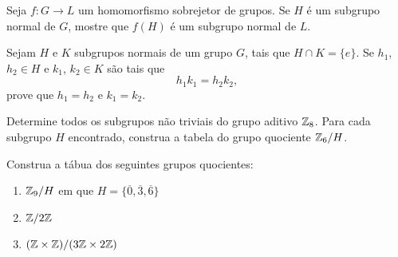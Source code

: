 \documentclass[12pt]{exam}
\begin{document}
    \questao{} Seja $f : G \to L$ um homomorfismo sobrejetor de grupos. Se $H$ é um subgrupo normal de $G$, mostre que $f(H)$ é um subgrupo normal de $L$.
  
    \vspace{.3cm}

    \questao{} Sejam $H$ e $K$ subgrupos normais de um grupo $G$, tais que $H \cap K = \{e\}$. Se $h_1$, $h_2 \in H$ e $k_1$, $k_2 \in K$ são tais que
    \[
      h_1k_1 = h_2k_2,
    \]
    prove que $h_1 = h_2$ e $k_1 = k_2$.

    \vspace{.3cm}

    \questao{} Determine todos os subgrupos não triviais do grupo aditivo $\mathbb{Z}_8$. Para cada subgrupo $H$ encontrado, construa a tabela do grupo quociente $\mathbb{Z}_6/H$.

    \vspace{.3cm}

    \questao{} Construa a tábua dos seguintes grupos quocientes:
    \begin{enumerate}[label=({\alph*})]
      \item $\mathbb{Z}_9/H$ em que $H = \{\overline{0}, \overline{3}, \overline{6}\}$

      \item $\mathbb{Z}/2\mathbb{Z}$

      \item $(\mathbb{Z} \times \mathbb{Z})/(3\mathbb{Z} \times 2\mathbb{Z})$
    \end{enumerate}
\end{document}

